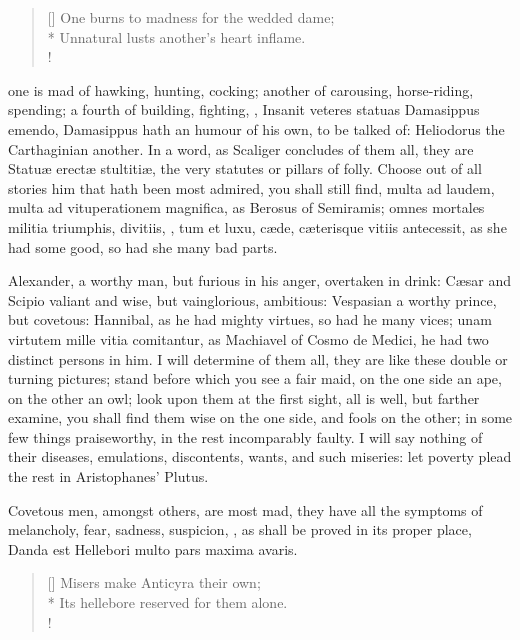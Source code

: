 {\settowidth{\versewidth}{One burns to madness for the wedded dame;}
\begin{verse}[\versewidth]
One burns to madness for the wedded dame;\\*
Unnatural lusts another's heart inflame.\\!
\end{verse}

one is mad of hawking, hunting, cocking; another of carousing,
horse-riding, spending; a fourth of building, fighting, \etc{}, Insanit
veteres statuas Damasippus emendo, Damasippus hath an humour of his
own, to be talked of: Heliodorus the Carthaginian another. In a
word, as Scaliger concludes of them all, they are Statu\ae{} erect\ae{}
stultiti\ae{}, the very statutes or pillars of folly. Choose out of all
stories him that hath been most admired, you shall still find, multa ad
laudem, multa ad vituperationem magnifica, as Berosus of
Semiramis; omnes mortales militia triumphis, divitiis, \etc{}, tum et
luxu, c\ae{}de, c\ae{}terisque vitiis antecessit, as she had some good, so
had she many bad parts.

Alexander, a worthy man, but furious in his anger, overtaken in drink:
C\ae{}sar and Scipio valiant and wise, but vainglorious, ambitious:
Vespasian a worthy prince, but covetous: Hannibal, as he had
mighty virtues, so had he many vices; unam virtutem mille vitia
comitantur, as Machiavel of Cosmo de Medici, he had two distinct
persons in him. I will determine of them all, they are like these
double or turning pictures; stand before which you see a fair maid, on
the one side an ape, on the other an owl; look upon them at the first
sight, all is well, but farther examine, you shall find them wise on
the one side, and fools on the other; in some few things praiseworthy,
in the rest incomparably faulty. I will say nothing of their diseases,
emulations, discontents, wants, and such miseries: let poverty plead
the rest in Aristophanes' Plutus.

Covetous men, amongst others, are most mad, they have all the
symptoms of melancholy, fear, sadness, suspicion, \etc{}, as shall be
proved in its proper place,
Danda est Hellebori multo pars maxima avaris.

\settowidth{\versewidth}{Its hellebore reserved for them alone.}
\begin{verse}[\versewidth]
Misers make Anticyra their own;\\*
Its hellebore reserved for them alone.\\!
\end{verse}

}
